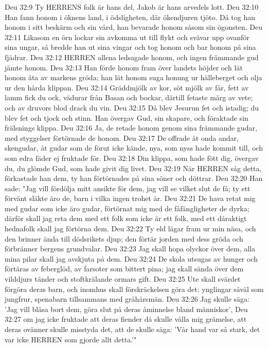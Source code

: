 Deu 32:9  Ty HERRENS folk är hans del, Jakob är hans arvedels lott.
Deu 32:10  Han fann honom i öknens land, i ödsligheten, där ökendjuren tjöto. Då tog han honom i sitt beskärm och sin vård, han bevarade honom såsom sin ögonsten.
Deu 32:11  Likasom en örn lockar sin avkomma ut till flykt och svävar upp ovanför sina ungar, så bredde han ut sina vingar och tog honom och bar honom på sina fjädrar.
Deu 32:12  HERREN allena ledsagade honom, och ingen främmande gud jämte honom.
Deu 32:13  Han förde honom fram över landets höjder och lät honom äta av markens gröda; han lät honom suga honung ur hälleberget och olja ur den hårda klippan.
Deu 32:14  Gräddmjölk av kor, söt mjölk av får, fett av lamm fick du ock, vädurar från Basan och bockar, därtill fetaste märg av vete; och av druvors blod drack du vin.
Deu 32:15  Då blev Jesurun fet och istadig; du blev fet och tjock och stinn. Han övergav Gud, sin skapare, och föraktade sin frälsnings klippa.
Deu 32:16  Ja, de retade honom genom sina främmande gudar, med styggelser förtörnade de honom.
Deu 32:17  De offrade åt onda andar, skengudar, åt gudar som de förut icke kände, nya, som nyss hade kommit till, och som edra fäder ej fruktade för.
Deu 32:18  Din klippa, som hade fött dig, övergav du, du glömde Gud, som hade givit dig livet.
Deu 32:19  När HERREN såg detta, förkastade han dem, ty han förtörnades på sina söner och döttrar.
Deu 32:20  Han sade: "Jag vill fördölja mitt ansikte för dem, jag vill se vilket slut de få; ty ett förvänt släkte äro de, barn i vilka ingen trohet är.
Deu 32:21  De hava retat mig med gudar som icke äro gudar, förtörnat mig med de fåfängligheter de dyrka; därför skall jag reta dem med ett folk som icke är ett folk, med ett dåraktigt hednafolk skall jag förtörna dem.
Deu 32:22  Ty eld lågar fram ur min näsa, och den brinner ända till dödsrikets djup; den förtär jorden med dess gröda och förbränner bergens grundvalar.
Deu 32:23  Jag skall hopa olyckor över dem, alla mina pilar skall jag avskjuta på dem.
Deu 32:24  De skola utsugas av hunger och förtäras av feberglöd, av farsoter som bittert pina; jag skall sända över dem vilddjurs tänder och stoftkrälande ormars gift.
Deu 32:25  Ute skall svärdet förgöra deras barn, och inomhus skall förskräckelsen göra det: ynglingar såväl som jungfrur, spenabarn tillsammans med gråhårsmän.
Deu 32:26  Jag skulle säga: 'Jag vill blåsa bort dem, göra slut på deras åminnelse bland människor',
Deu 32:27  om jag icke fruktade att deras fiender då skulle vålla mig grämelse, att deras ovänner skulle misstyda det, att de skulle säga: 'Vår hand var så stark, det var icke HERREN som gjorde allt detta.'"
